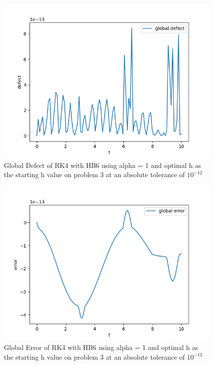 \documentclass{article}
\begin{document}
\begin{figure}[H]
\centering
\includegraphics[width=0.7\linewidth]{./figures/sharp_tolerance_rk4_with_hb6_p3_global_defect}
\caption{Global Defect of RK4 with HB6 using alpha = 1 and optimal h as the starting h value on problem 3 at an absolute tolerance of $10^{-12}$}
\label{fig:sharp_tolerance_rk4_with_hb6_p3_global_defect}
\end{figure}

\begin{figure}[H]
\centering
\includegraphics[width=0.7\linewidth]{./figures/sharp_tolerance_rk4_with_hb6_p3_global_error}
\caption{Global Error of RK4 with HB6 using alpha = 1 and optimal h as the starting h value on problem 3 at an absolute tolerance of $10^{-12}$}
\label{fig:sharp_tolerance_rk4_with_hb6_p3_global_error}
\end{figure}
\end{document}
